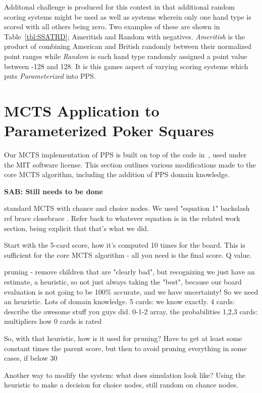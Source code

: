 \documentclass[letterpaper]{article}
\begin{document}
Additonal challenge is produced for this contest in that additional random scoring systems might be used as well as systems wherein only one hand type is scored with all others being zero. Two examples of these are shown in Table~\ref{tbl:SSATRD}; Ameritish and Random with negatives. \emph{Ameritish} is the product of combining American and British randomly between their normalized point ranges while \emph{Random} is each hand type randomly assigned a point value between -128 and 128. It is this games aspect of varying scoring systems which puts \emph{Parameterized} into PPS.

\section{MCTS Application to Parameterized Poker Squares}

Our MCTS implementation of PPS is built on top of the code in~\cite{hughart2012uct}, used under the MIT software license. This section outlines various modifications made to the core MCTS algorithm, including the addition of PPS domain knowledge.

{\bf SAB: Still needs to be done}

standard MCTS with chance and choice nodes. We used "equation 1"   backslash ref brace  closebrace   . Refer back to whatever equation is in the related work section, being explicit that that's what we did.

Start with the 5-card score, how it's computed 10 times for the board. This is sufficient for the core MCTS algorithm - all you need is the final score. Q value.

pruning - remove children that are "clearly bad", but recognizing we just have an estimate, a heuristic, so not just always taking the "best", because our board evaluation is not going to be 100\% accurate, and we have uncertainty! So we need an heuristic. Lots of domain knowledge.
5 cards: we know exactly.
4 cards: describe the awesome stuff you guys did. 0-1-2 array, the probabilities
1,2,3 cards: multipliers
how 0 cards is rated

So, with that heuristic, how is it used for pruning? Have to get at least some constant times the parent score, but then to avoid pruning everything in some cases, if below 30%

Another way to modify the system: what does simulation look like? Using the heuristic to make a decision for choice nodes, still random on chance nodes.
\end{document}
